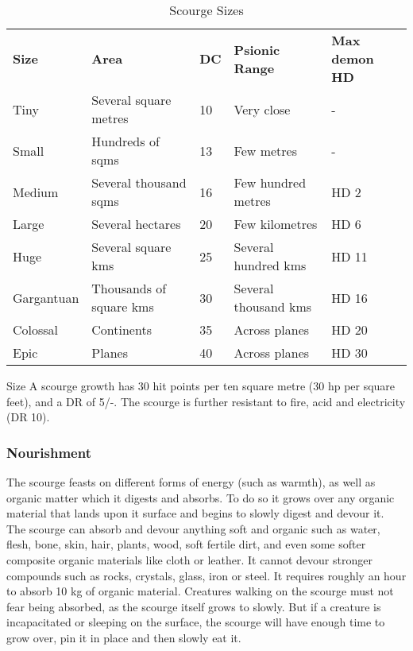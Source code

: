\begin{table*}[!htb]
  \caption{Scourge Sizes}
  \begin{tabular}{l l l l l}
    \textbf{Size} & \textbf{Area}             & \textbf{DC} & \textbf{Psionic Range} & \textbf{Max demon HD} \\
    Tiny          & Several square metres     & 10          & Very close             & - \\
    Small         & Hundreds of sqms          & 13          & Few metres             & - \\
    Medium        & Several thousand sqms     & 16          & Few hundred metres     & HD 2 \\
    Large         & Several hectares          & 20          & Few kilometres         & HD 6 \\
    Huge          & Several square kms        & 25          & Several hundred kms    & HD 11 \\
    Gargantuan    & Thousands of square kms   & 30          & Several thousand kms   & HD 16 \\
    Colossal      & Continents                & 35          & Across planes          & HD 20 \\
    Epic          & Planes                    & 40          & Across planes          & HD 30 \\
  \end{tabular}
\end{table*}

\begin{35e}{Size}
  A scourge growth has 30 hit points per ten square metre (30 hp per square
  feet), and a DR of 5/-. The scourge is further resistant to fire, acid and
  electricity (DR 10).
\end{35e}

\subsubsection{Nourishment}

The scourge feasts on different forms of energy (such as warmth), as well as
organic matter which it digests and absorbs. To do so it grows over any
organic material that lands upon it surface and begins to slowly digest and
devour it. The scourge can absorb and devour anything soft and organic such as
water, flesh, bone, skin, hair, plants, wood, soft fertile dirt, and even some
softer composite organic materials like cloth or leather. It cannot devour
stronger compounds such as rocks, crystals, glass, iron or steel. It requires
roughly an hour to absorb 10 kg of organic material. Creatures walking on the
scourge must not fear being absorbed, as the scourge itself grows to slowly.
But if a creature is incapacitated or sleeping on the surface, the scourge
will have enough time to grow over, pin it in place and then slowly eat it.

